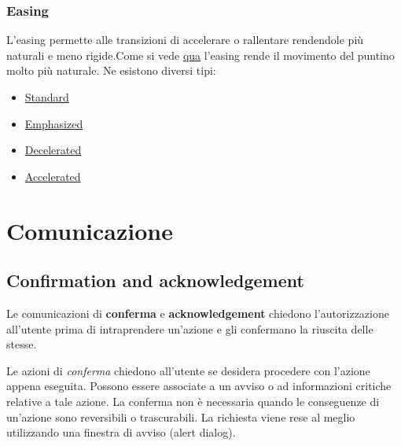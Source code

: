 \documentclass[12pt, a4paper]{report}
\begin{document}
		\subsubsection{Easing}
		L'easing permette alle transizioni di accelerare o rallentare rendendole più naturali e meno rigide.Come si vede \href{https://kstatic.googleusercontent.com/files/cd28926c3e6b98926788199361bc3e613f6fd98234fa12e143fe528ba629f0ee7318c16acf5a389820d4789f43c12b011880909e39a59d73377a5a1c270bbe52}{qua}
		l'easing rende il movimento del puntino molto più naturale.
		Ne esistono diversi tipi:
		\begin{itemize}
			\item \href{https://kstatic.googleusercontent.com/files/c60193433c491a0ea5b95fd2740fab851ff3572e5191ceab47a9a9586262a6bf354baa78f19b1bdbaca0674562971cec7d0e8e45f56e8d79dadd95329ed907d5}{Standard}
			\item \href{https://kstatic.googleusercontent.com/files/1b3b1c294a5075226c259f5af1569e9e79606bd65ddb27afa1ccf4815d627c6c9b6c787d59a7bb26861694727a30e6fcf5d4def3388d973920339d25aca6c8f3}{Emphasized}
			\item \href{https://kstatic.googleusercontent.com/files/b624b31824d5a199f82de3273246101bf20dbb079c3a81a2b7b66bf6ef96ac97808fc8f27180310345f977aae93c2581a1f9280963c92ed71c95107583fe3d9a}{Decelerated}
			\item \href{https://kstatic.googleusercontent.com/files/4e2afcefc0aa8b74bdd1980114e5e8bd8b7b13e7944c17f9710731c22fed2f80e89edb91ec904a14d511a469de73f487836f86e0c91f0e98f31419ed3106a408}{Accelerated}
		\end{itemize}

	\section{Comunicazione}
	\subsection{Confirmation and acknowledgement}
	Le comunicazioni di \textbf{conferma} e \textbf{acknowledgement} chiedono l’autorizzazione all’utente prima di intraprendere un'azione e gli confermano la riuscita delle stesse.

	Le azioni di \textit{conferma}  chiedono all'utente se desidera procedere con l'azione appena eseguita. Possono essere associate a un avviso o ad informazioni critiche relative a tale azione. La conferma non è necessaria quando le conseguenze di un'azione sono reversibili o trascurabili.
	La richiesta viene rese al meglio utilizzando una finestra di avviso (alert dialog).
\end{document}
